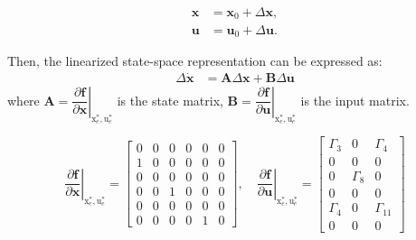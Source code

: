 \documentclass[3p]{elsarticle}
\begin{document}
\begin{align}
\mathbf{x} &= \mathbf{x}_0 + \Delta \mathbf{x}, \\
\mathbf{u} &= \mathbf{u}_0 + \Delta \mathbf{u}.
\end{align}

Then, the linearized state-space representation can be expressed as:
\begin{align}
{\Delta \mathbf{\dot x}} &= \mathbf{A} \Delta \mathbf{x} + \mathbf{B} \Delta \mathbf{u}
\end{align}
where
$\mathbf{A} = \left.\dfrac{\partial \mathbf{f}}{\partial \mathbf{x}}\right|_{\boldsymbol{{\mathrm{x}}}_e^*, \boldsymbol{{\mathrm{u}}}_e^*}$ is the state matrix,
$\mathbf{B} = \left.\dfrac{\partial \mathbf{f}}{\partial \mathbf{u}}\right|_{\boldsymbol{{\mathrm{x}}}_e^*, \boldsymbol{{\mathrm{u}}}_e^*}$ is the input matrix.

\begin{equation}
    \left.\dfrac{\partial \mathbf{f}}{\partial \mathbf{x}}\right|_{\boldsymbol{{\mathrm{x}}}_e^*, \boldsymbol{{\mathrm{u}}}_e^*} = \begin{bmatrix}
        0 & 0 & 0 & 0 & 0 & 0 \\
        1 & 0 & 0 & 0 & 0 & 0 \\
        0 & 0 & 0 & 0 & 0 & 0 \\
        0 & 0 & 1 & 0 & 0 & 0 \\
        0 & 0 & 0 & 0 & 0 & 0 \\
        0 & 0 & 0 & 0 & 1 & 0
    \end{bmatrix}, \quad \left.\dfrac{\partial \mathbf{f}}{\partial \mathbf{u}}\right|_{\boldsymbol{{\mathrm{x}}}_e^*, \boldsymbol{{\mathrm{u}}}_e^*} = 
    \begin{bmatrix}
       \Gamma_3 & 0 & \Gamma_4\\
       0 & 0 & 0 \\
       0 & \Gamma_8 & 0 \\
       0 & 0 & 0 \\
       \Gamma_4 & 0 & \Gamma_{11} \\
       0 & 0 & 0
   \end{bmatrix}
\end{equation}
\end{document}
